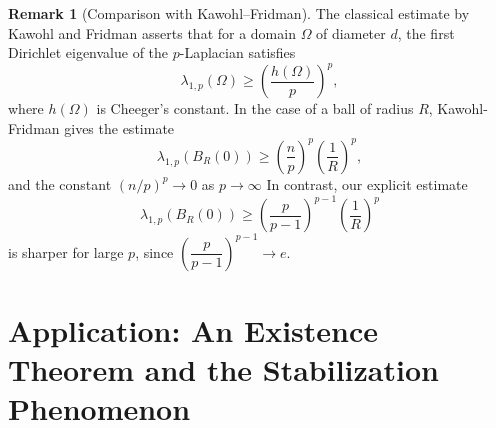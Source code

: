 \documentclass[11pt]{amsart}
\theoremstyle{definition}
\newtheorem{remark}[theorem]{Remark}
\begin{document}
\begin{remark}[Comparison with Kawohl–Fridman]
The classical estimate by Kawohl and Fridman \cite{KawohlFridman2003} asserts that for a domain $\Omega$ of diameter $d$, the first Dirichlet eigenvalue of the $p$-Laplacian satisfies
\[
\lambda_{1,p}(\Omega) \geq \left( \frac{h\left(\Omega\right)}{p} \right)^p,
\]
where $h\left(\Omega\right)$ is Cheeger's constant.
In the case of a ball of radius $R$, Kawohl-Fridman gives the estimate 
\[
\lambda_{1,p}(B_R\left(0\right))\geq \left(\frac{n}{p}\right)^p\left(\frac{1}{R}\right)^p,
\]
and the constant $\left(n/p\right)^p\rightarrow 0$ as $p\rightarrow \infty$
 In contrast, our explicit estimate
\[
\lambda_{1,p}(B_R\left(0\right)) \geq \left( \frac{p}{p-1} \right)^{p-1} \left( \frac{1}{R} \right)^p
\]
is sharper for large $p$, since $\left(\dfrac{p}{p-1}\right)^{p-1}\rightarrow e$.





\end{remark}

\section{Application: An Existence Theorem and the Stabilization Phenomenon}
\label{section:existence_result}
\end{document}

